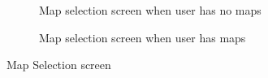 \begin{figure}[h]
\begin{subfigure}{.5\textwidth}
	\caption{Map selection screen when user has no maps}
	\label{fig:mapselnomap}
\end{subfigure}%
\begin{subfigure}{.5\textwidth}
	\centering
	\caption{Map selection screen when user has maps}
	\label{fig:mapselwithmap}
\end{subfigure}
\caption{Map Selection screen}
\label{fig:mapselection}
\end{figure}
\pagebreak
